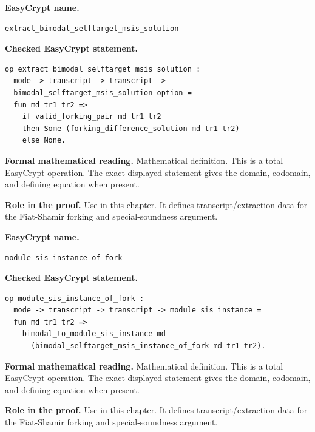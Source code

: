 \begin{formaldefinition}
\noindent\textbf{EasyCrypt name.}
\begin{lstlisting}[language=EasyCrypt,basicstyle=\ttfamily\scriptsize]
extract_bimodal_selftarget_msis_solution
\end{lstlisting}
\noindent\textbf{Checked EasyCrypt statement.}
\begin{lstlisting}[language=EasyCrypt,basicstyle=\ttfamily\scriptsize]
op extract_bimodal_selftarget_msis_solution :
  mode -> transcript -> transcript ->
  bimodal_selftarget_msis_solution option =
  fun md tr1 tr2 =>
    if valid_forking_pair md tr1 tr2
    then Some (forking_difference_solution md tr1 tr2)
    else None.
\end{lstlisting}
\noindent\textbf{Formal mathematical reading.}
Mathematical definition. This is a total EasyCrypt operation.  The exact displayed statement gives the domain, codomain, and defining equation when present.

\noindent\textbf{Role in the proof.}
Use in this chapter. It defines transcript/extraction data for the Fiat-Shamir forking and special-soundness argument.

\end{formaldefinition}

\begin{formaldefinition}
\noindent\textbf{EasyCrypt name.}
\begin{lstlisting}[language=EasyCrypt,basicstyle=\ttfamily\scriptsize]
module_sis_instance_of_fork
\end{lstlisting}
\noindent\textbf{Checked EasyCrypt statement.}
\begin{lstlisting}[language=EasyCrypt,basicstyle=\ttfamily\scriptsize]
op module_sis_instance_of_fork :
  mode -> transcript -> transcript -> module_sis_instance =
  fun md tr1 tr2 =>
    bimodal_to_module_sis_instance md
      (bimodal_selftarget_msis_instance_of_fork md tr1 tr2).
\end{lstlisting}
\noindent\textbf{Formal mathematical reading.}
Mathematical definition. This is a total EasyCrypt operation.  The exact displayed statement gives the domain, codomain, and defining equation when present.

\noindent\textbf{Role in the proof.}
Use in this chapter. It defines transcript/extraction data for the Fiat-Shamir forking and special-soundness argument.

\end{formaldefinition}

